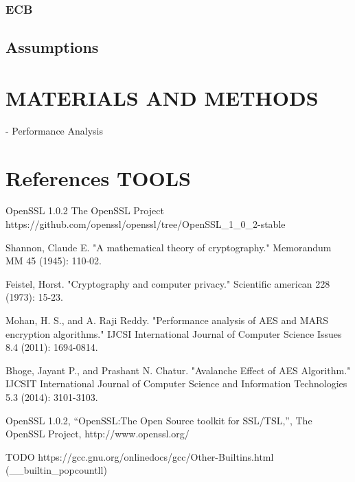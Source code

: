 \documentclass[11pt]{scrartcl}
\begin{document}
\subsubsection{ECB}

\subsection{Assumptions}

\section{MATERIALS AND METHODS}

- Performance Analysis



\section{References TOOLS}

OpenSSL 1.0.2
The OpenSSL Project
https://github.com/openssl/openssl/tree/OpenSSL_1_0_2-stable



\begin{thebibliography}{laengste Labelbreite}

   Shannon, Claude E. "A mathematical theory of cryptography." Memorandum MM 45 (1945): 110-02.
  
   Feistel, Horst. "Cryptography and computer privacy." Scientific american 228 (1973): 15-23.
   
  Mohan, H. S., and A. Raji Reddy. "Performance analysis of AES and MARS encryption algorithms." IJCSI International Journal of Computer Science Issues 8.4 (2011): 1694-0814.
  
    Bhoge, Jayant P., and Prashant N. Chatur. "Avalanche Effect of AES Algorithm." IJCSIT International Journal of Computer Science and Information Technologies 5.3 (2014): 3101-3103.

   OpenSSL 1.0.2, “OpenSSL:The Open Source toolkit for SSL/TSL,”, The OpenSSL Project, http://www.openssl.org/

  TODO
  https://gcc.gnu.org/onlinedocs/gcc/Other-Builtins.html (__builtin_popcountll)
  
\end{thebibliography}
\end{document}
